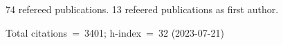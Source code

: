 74 refereed publications. 13 refeered publications as first author.

Total citations~=~3401; h-index~=~32 (2023-07-21)
